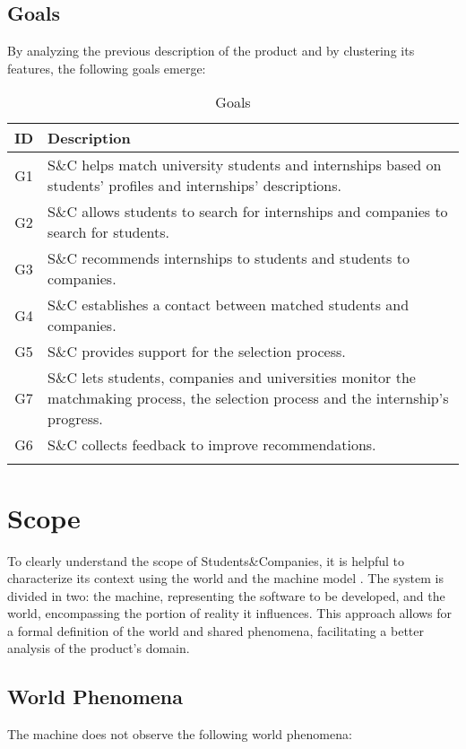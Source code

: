 \subsection{Goals}
By analyzing the previous description of the product and by clustering its features, the following goals emerge:

\renewcommand{\arraystretch}{1.5}
\begin{longtable}{|c|p{12.5cm}|}
    \hline \rowcolor{polimiblue!40}
    \textbf{ID} & \textbf{Description} \\ \hline
    G1 & S\&C helps match university students and internships based on students' profiles and internships' descriptions. \\ \hline
    G2 & S\&C allows students to search for internships and companies to search for students. \\ \hline
    G3 & S\&C recommends internships to students and students to companies. \\ \hline
    G4 & S\&C establishes a contact between matched students and companies. \\ \hline
    G5 & S\&C provides support for the selection process. \\ \hline
    G7 & S\&C lets students, companies and universities monitor the matchmaking process, the selection process and the internship's progress. \\ \hline
    G6 & S\&C collects feedback to improve recommendations. \\ \hline
\caption{Goals}
\end{longtable}

\section{Scope}
To clearly understand the scope of Students\&Companies, it is helpful to characterize its context using the world and the machine model \cite{jackson1995}.
The system is divided in two: the machine, representing the software to be developed, and the world, encompassing the portion of reality it influences.
This approach allows for a formal definition of the world and shared phenomena, facilitating a better analysis of the product's domain.

\subsection{World Phenomena}
The machine does not observe the following world phenomena:

